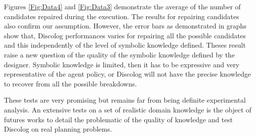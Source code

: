 \documentclass[conference]{IEEEtran}
\begin{document}
	 
		 
	
	\par  Figures \ref{Fig:Data4} and \ref{Fig:Data3} demonstrate the average of the number of candidates repaired during the execution. The results for repairing  candidates also confirm our assumption. However, the error bars as demonstrated in graphs show that, Discolog performances varies for repairing all the possible candidates and this independently of the level of symbolic knowledge defined. 	Theses result raise a new question of the quality of the symbolic knowledge defined by the designer. Symbolic knowledge is limited, then it has to be expressive and very representative of the agent policy, or Discolog will not have the precise knowledge to recover from all the possible breakdowns. 
	\par These tests are very promising but remains far from being definite experimental analysis. An extensive tests on a set of realistic domain knowledge is the object of futures works to detail the problematic of the quality of knowledge and test Discolog on real planning problems. 
	 	
	
	
\end{document}

